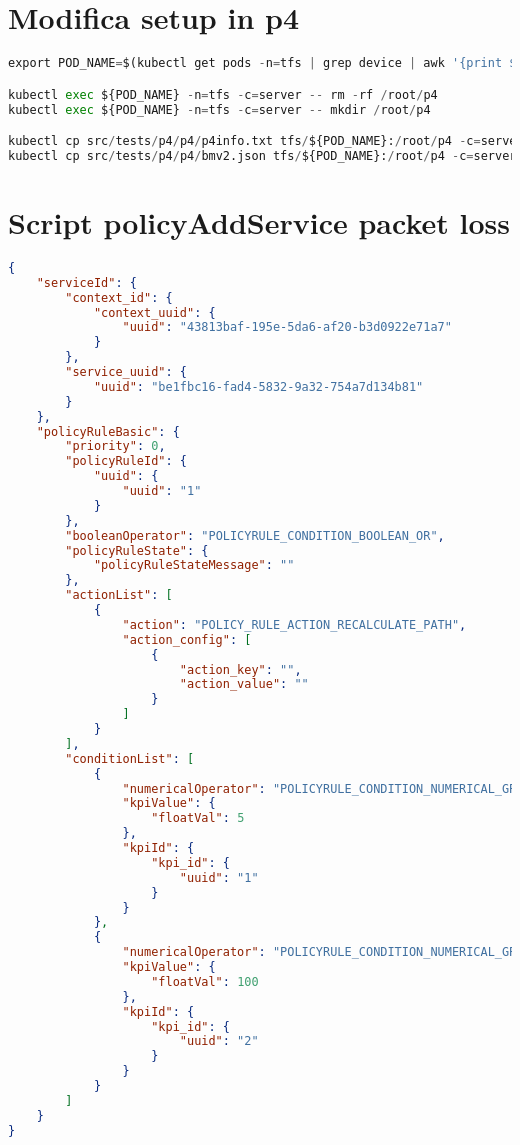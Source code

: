 \section{Modifica setup in p4}
\begin{lstlisting}[language=Python]
export POD_NAME=$(kubectl get pods -n=tfs | grep device | awk '{print $1}')

kubectl exec ${POD_NAME} -n=tfs -c=server -- rm -rf /root/p4
kubectl exec ${POD_NAME} -n=tfs -c=server -- mkdir /root/p4

kubectl cp src/tests/p4/p4/p4info.txt tfs/${POD_NAME}:/root/p4 -c=server
kubectl cp src/tests/p4/p4/bmv2.json tfs/${POD_NAME}:/root/p4 -c=server
\end{lstlisting}

\section{Script policyAddService packet loss}
\label{cap:pktl}
\begin{lstlisting}[language=json]
{
    "serviceId": {
        "context_id": {
            "context_uuid": {
                "uuid": "43813baf-195e-5da6-af20-b3d0922e71a7"
            }
        },
        "service_uuid": {
            "uuid": "be1fbc16-fad4-5832-9a32-754a7d134b81"
        }
    },
    "policyRuleBasic": {
        "priority": 0,
        "policyRuleId": {
            "uuid": {
                "uuid": "1"
            }
        },
        "booleanOperator": "POLICYRULE_CONDITION_BOOLEAN_OR",
        "policyRuleState": {
            "policyRuleStateMessage": ""
        },
        "actionList": [
            {
                "action": "POLICY_RULE_ACTION_RECALCULATE_PATH",
                "action_config": [
                    {
                        "action_key": "",
                        "action_value": ""
                    }
                ]
            }
        ],
        "conditionList": [
            {
                "numericalOperator": "POLICYRULE_CONDITION_NUMERICAL_GREATER_THAN",
                "kpiValue": {
                    "floatVal": 5
                },
                "kpiId": {
                    "kpi_id": {
                        "uuid": "1"
                    }
                }
            },
            {
                "numericalOperator": "POLICYRULE_CONDITION_NUMERICAL_GREATER_THAN",
                "kpiValue": {
                    "floatVal": 100
                },
                "kpiId": {
                    "kpi_id": {
                        "uuid": "2"
                    }
                }
            }
        ]
    }
}
\end{lstlisting}

